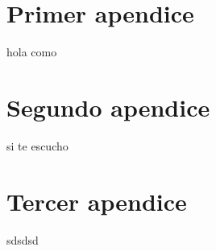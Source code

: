 \appendix
\chapter{Primer apendice}
hola como
\chapter{Segundo apendice}
si te escucho
\chapter{Tercer apendice}
sdsdsd

